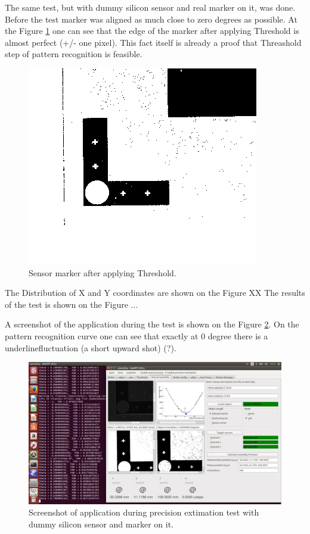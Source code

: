The same test, but with dummy silicon sensor and real marker on it, was done. Before the test marker was aligned as much close to zero degrees as possible. At the Figure \ref{fig:thresholded_marker} one can see that the edge of the marker after applying Threshold is almost perfect (+/- one pixel). This fact itself is already a proof that Threashold step of pattern recognition is feasible.

\begin{figure}[ht]\centering
\includegraphics[width=0.8\linewidth]{Data/Precision_tests/Thresholded_marker.png}
\caption{Sensor marker after applying Threshold.}
\label{fig:thresholded_marker}
\end{figure}

The Distribution of X and Y coordinates are shown on the Figure XX
The results of the test is shown on the Figure ...





A screenshot of the application during the test is shown on the Figure \ref{fig:marker_pattern_recognition_screenshot}. On the pattern recognition curve one can see that exactly at 0 degree there is a underline{fluctuation (a short upward shot) (?)}. 

\begin{figure}[ht]\centering
\includegraphics[width=0.8\linewidth]{Data/Precision_tests/Marker_pattern_recognition_screenshot.png}
\caption{Screenshot of application during precision extimation test with dummy silicon sensor and marker on it.}
\label{fig:marker_pattern_recognition_screenshot}
\end{figure}

